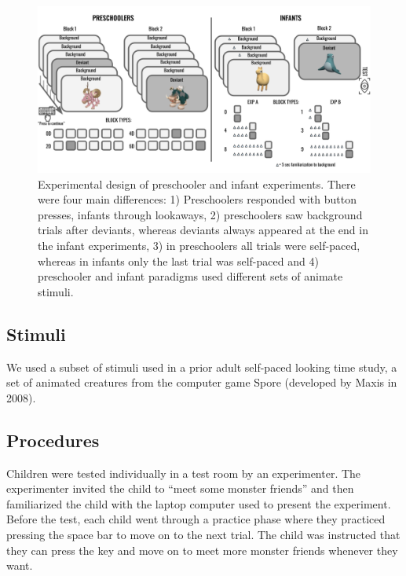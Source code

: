 \documentclass[10pt, letterpaper]{article}
\newenvironment{CodeChunk}{}{}
\begin{document}
\begin{CodeChunk}
\begin{figure}[h]

{\centering \includegraphics{figs/experimental_design-1} 

}

\caption[Experimental design of preschooler and infant experiments]{Experimental design of preschooler and infant experiments. There were four main differences: 1) Preschoolers responded with button presses, infants through lookaways, 2) preschoolers saw background trials after deviants, whereas deviants always appeared at the end in the infant experiments, 3) in preschoolers all trials were self-paced, whereas in infants only the last trial was self-paced and 4) preschooler and infant paradigms used different sets of animate stimuli.}\label{fig:experimental_design}
\end{figure}
\end{CodeChunk}

\hypertarget{stimuli}{%
\subsection{Stimuli}\label{stimuli}}

We used a subset of stimuli used in a prior adult self-paced looking
time study, a set of animated creatures from the computer game Spore
(developed by Maxis in 2008).

\hypertarget{procedures}{%
\subsection{Procedures}\label{procedures}}

Children were tested individually in a test room by an experimenter. The
experimenter invited the child to ``meet some monster friends'' and then
familiarized the child with the laptop computer used to present the
experiment. Before the test, each child went through a practice phase
where they practiced pressing the space bar to move on to the next
trial. The child was instructed that they can press the key and move on
to meet more monster friends whenever they want.
\end{document}
